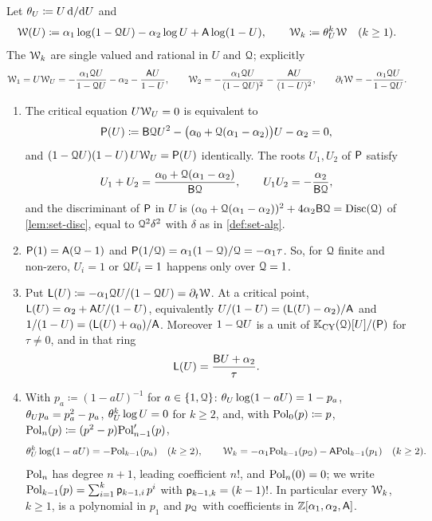 \begin{lem}
\label{lem:set-crit}
Let $\theta_{U}\coloneqq U\,\mathrm{d}/\mathrm{d} U$ and
\[
\mathcal{W}(U)\coloneqq\alpha_1\log(1-\mathcal{Q} U)-\alpha_2\log U+\mathsf{A}\log(1-U),\qquad \mathcal{W}_k\coloneqq\theta_{U}^k\mathcal{W}\quad(k\geq1).
\]
The $\mathcal{W}_k$ are single valued and rational in $U$ and $\mathcal{Q}$; explicitly
\[
\mathcal{W}_1=U\mathcal{W}_U=-\frac{\alpha_1\mathcal{Q} U}{1-\mathcal{Q} U}-\alpha_2-\frac{\mathsf{A} U}{1-U},\qquad
\mathcal{W}_2=-\frac{\alpha_1\mathcal{Q} U}{(1-\mathcal{Q} U)^2}-\frac{\mathsf{A} U}{(1-U)^2},\qquad
\partial_t\mathcal{W}=-\frac{\alpha_1\mathcal{Q} U}{1-\mathcal{Q} U}.
\]
\begin{enumerate}
\item The critical equation $U\mathcal{W}_U=0$ is equivalent to
\begin{equation}
\label{eq:set-P}
\mathsf{P}(U)\coloneqq\mathsf{B}\mathcal{Q} U^2-\big(\alpha_0+\mathcal{Q}(\alpha_1-\alpha_2)\big)U-\alpha_2=0 ,
\end{equation}
and $(1-\mathcal{Q} U)(1-U)\,U\mathcal{W}_U=\mathsf{P}(U)$ identically. The roots $U_1,U_2$ of $\mathsf{P}$ satisfy
\[
U_1+U_2=\frac{\alpha_0+\mathcal{Q}(\alpha_1-\alpha_2)}{\mathsf{B}\mathcal{Q}},\qquad U_1U_2=-\frac{\alpha_2}{\mathsf{B}\mathcal{Q}},
\]
and the discriminant of $\mathsf{P}$ in $U$ is $(\alpha_0+\mathcal{Q}(\alpha_1-\alpha_2))^2+4\alpha_2\mathsf{B}\mathcal{Q}=\operatorname{Disc}(\mathcal{Q})$ of \cref{lem:set-disc}, equal to $\mathcal{Q}^2\delta^2$ with $\delta$ as in \cref{def:set-alg}.
\item $\mathsf{P}(1)=\mathsf{A}(\mathcal{Q}-1)$ and $\mathsf{P}(1/\mathcal{Q})=\alpha_1(1-\mathcal{Q})/\mathcal{Q}=-\alpha_1\tau$. So, for $\mathcal{Q}$ finite and non-zero, $U_i=1$ or $\mathcal{Q} U_i=1$ happens only over $\mathcal{Q}=1$.
\item Put $\mathsf{L}(U)\coloneqq-\alpha_1\mathcal{Q} U/(1-\mathcal{Q} U)=\partial_t\mathcal{W}$. At a critical point, $\mathsf{L}(U)=\alpha_2+\mathsf{A} U/(1-U)$, equivalently $U/(1-U)=(\mathsf{L}(U)-\alpha_2)/\mathsf{A}$ and $1/(1-U)=(\mathsf{L}(U)+\alpha_0)/\mathsf{A}$. Moreover $1-\mathcal{Q} U$ is a unit of $\mathbb{K}_{\mathrm{CY}}(\mathcal{Q})[U]/(\mathsf{P})$ for $\tau\neq0$, and in that ring
\[
\mathsf{L}(U)=\frac{\mathsf{B} U+\alpha_2}{\tau}.
\]
\item With $p_a\coloneqq(1-aU)^{-1}$ for $a\in\{1,\mathcal{Q}\}$: $\theta_{U}\log(1-aU)=1-p_a$, $\theta_{U} p_a=p_a^2-p_a$, $\theta_{U}^k\log U=0$ for $k\geq2$, and, with $\mathrm{Pol}_0(p)\coloneqq p$, $\mathrm{Pol}_n(p)\coloneqq(p^2-p)\mathrm{Pol}_{n-1}'(p)$,
\begin{equation}
\label{eq:set-Wk}
\theta_{U}^k\log(1-aU)=-\mathrm{Pol}_{k-1}(p_a)\quad(k\geq2),\qquad \mathcal{W}_k=-\alpha_1\mathrm{Pol}_{k-1}(p_{\mathcal{Q}})-\mathsf{A}\mathrm{Pol}_{k-1}(p_1)\quad(k\geq2).
\end{equation}
$\mathrm{Pol}_n$ has degree $n+1$, leading coefficient $n!$, and $\mathrm{Pol}_n(0)=0$; we write $\mathrm{Pol}_{k-1}(p)=\sum_{i=1}^{k}\mathsf{p}_{k-1,i}\,p^i$ with $\mathsf{p}_{k-1,k}=(k-1)!$. In particular every $\mathcal{W}_k$, $k\geq1$, is a polynomial in $p_1$ and $p_{\mathcal{Q}}$ with coefficients in $\mathbb{Z}[\alpha_1,\alpha_2,\mathsf{A}]$.
\end{enumerate}
\end{lem}

